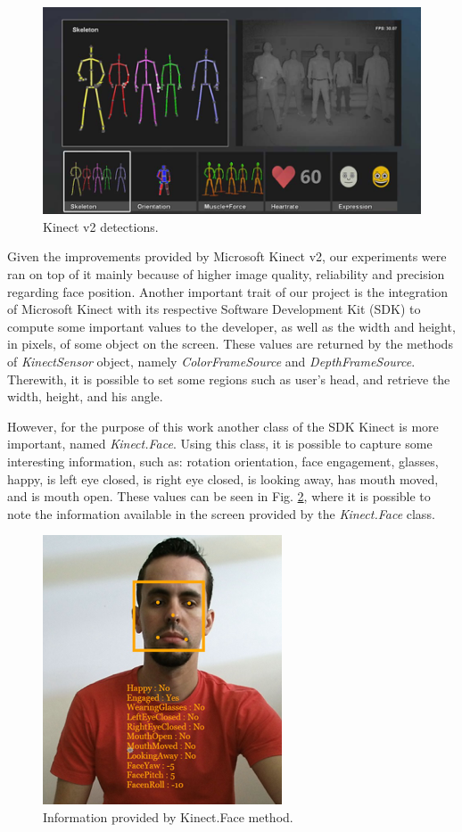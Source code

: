 \documentclass[10pt, conference]{IEEEtran}
\begin{document}
    \begin{figure}[t]
        \centering
        \includegraphics{figures/pic2.png}
        \caption{Kinect v2 detections.}
        \label{fig:fig1}
    \end{figure}

	Given the improvements provided by Microsoft Kinect v2, our experiments were ran on top of it mainly because of higher image quality, reliability and precision regarding face position.
	Another important trait of our project is the integration of Microsoft Kinect with its respective Software Development Kit (SDK) to compute some important values to the developer, as well as the width and height, in pixels, of some object on the screen.
    These values are returned by the methods of \emph{KinectSensor} object, namely \emph{ColorFrameSource} and \emph{DepthFrameSource}.
	Therewith, it is possible to set some regions such as user's head, and retrieve the width, height, and his angle.

	However, for the purpose of this work another class of the SDK Kinect is more important, named \emph{Kinect.Face}. 
	Using this class, it is possible to capture some interesting information, such as: rotation orientation, face engagement, glasses, happy, is left eye closed, is right eye closed, is looking away, has mouth moved, and is mouth open. 
	These values can be seen in Fig. \ref{fig:fig2}, where it is possible to note the information available in the screen provided by the \emph{Kinect.Face} class.

    \begin{figure}[t]
        \centering
        \includegraphics{figures/pic3.png}
        \caption{Information provided by Kinect.Face method.}
        \label{fig:fig2}
    \end{figure}
\end{document}
